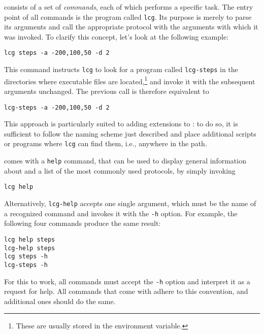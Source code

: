 

\progname consists of a set of {\it commands}, each of which performs
a specific task.
The entry point of all \progname commands is the program called
\verb+lcg+. Its purpose is merely to parse its arguments and
call the appropriate protocol with the arguments with which it was
invoked. To clarify this concept, let's look at the following example:
\begin{lstlisting}
lcg steps -a -200,100,50 -d 2
\end{lstlisting}
This command instructs \verb+lcg+ to look for a program called
\verb+lcg-steps+ in the directories where executable files are
located,\footnote{These are usually stored in the 
environment variable.} and invoke it with the subsequent arguments
unchanged. The previous call is therefore equivalent to
\begin{lstlisting}
lcg-steps -a -200,100,50 -d 2
\end{lstlisting}
This approach is particularly suited to adding extensions to
\progname: to do so, it is sufficient to follow the naming scheme just
described and place additional scripts or programs where
\verb+lcg+ can find them, i.e., anywhere in the path.
 
\progname comes with a \verb+help+ command, that can be used to
display general information about \progname and a list of the most
commonly used protocols, by simply invoking
\begin{lstlisting}
lcg help
\end{lstlisting}
Alternatively, \verb+lcg-help+ accepts one single argument,
which must be the name of a recognized command and invokes it with
the \verb+-h+ option. For example, the following four commands
produce the same result:
\begin{lstlisting}
lcg help steps
lcg-help steps
lcg steps -h
lcg-steps -h
\end{lstlisting}
For this to work, all commands must accept the \verb+-h+ option
and interpret it as a request for help. All commands that come with
\progname adhere to this convention, and additional ones should
do the same.

